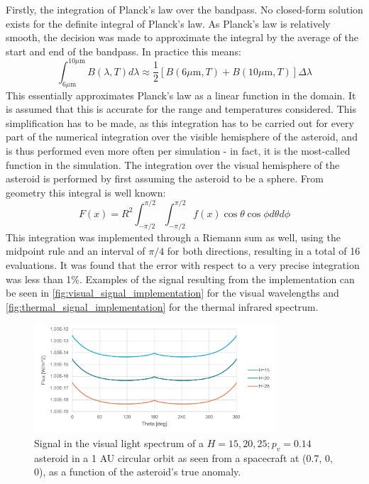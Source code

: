 Firstly, the integration of Planck's law over the bandpass. No closed-form solution exists for the definite integral of Planck's law. As Planck's law is relatively smooth, the decision was made to approximate the integral by the average of the start and end of the bandpass. In practice this means:
\begin{equation}
 \int _{6 \mu\mathrm{m}}^{10 \mu\mathrm{m}} B(\lambda, T) d\lambda \approx \frac{1}{2}\left[B(6 \mu\mathrm{m}, T) + B(10 \mu\mathrm{m}, T)\right] \Delta \lambda
\end{equation}
This essentially approximates Planck's law as a linear function in the domain. It is assumed that this is accurate for the range and temperatures considered. This simplification has to be made, as this integration has to be carried out for every part of the numerical integration over the visible hemisphere of the asteroid, and is thus performed even more often per simulation - in fact, it is the most-called function in the simulation. The integration over the visual hemisphere of the asteroid is performed by first assuming the asteroid to be a sphere. From geometry this integral is well known:
\begin{equation}
 F(x) = R^2\int_{-\pi/2}^{\pi/2}\int_{-\pi/2}^{\pi/2} f(x) \cos \theta \cos \phi d \theta d \phi
\end{equation}
This integration was implemented through a Riemann sum as well, using the midpoint rule and an interval of $\pi/4$ for both directions, resulting in a total of 16 evaluations. It was found that the error with respect to a very precise integration was less than 1\%. Examples of the signal resulting from the implementation can be seen in \autoref{fig:visual_signal_implementation} for the visual wavelengths and \autoref{fig:thermal_signal_implementation} for the thermal infrared spectrum.

\begin{figure}[htbp]
 \centering
 \includegraphics[width=0.8\textwidth]{img/implementation_vis_signal.pdf}
 \caption{Signal in the visual light spectrum of a $H=15, 20, 25; p_v=0.14$ asteroid in a 1 AU circular orbit as seen from a spacecraft at (0.7, 0, 0), as a function of the asteroid's true anomaly.}
 \label{fig:visual_signal_implementation}
\end{figure}



